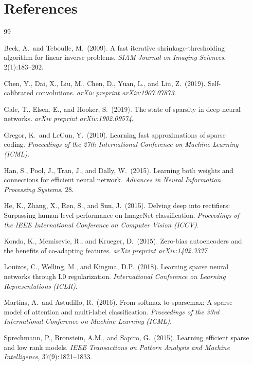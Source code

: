 \documentclass{article}
\begin{document}
\section*{References}
{\small
\begin{thebibliography}{99}

Beck, A.\ and Teboulle, M.\ (2009).
A fast iterative shrinkage-thresholding algorithm for linear inverse problems.
{\it SIAM Journal on Imaging Sciences}, 2(1):183--202.

Chen, Y., Dai, X., Liu, M., Chen, D., Yuan, L., and Liu, Z.\ (2019).
Self-calibrated convolutions.
{\it arXiv preprint arXiv:1907.07873}.

Gale, T., Elsen, E., and Hooker, S.\ (2019).
The state of sparsity in deep neural networks.
{\it arXiv preprint arXiv:1902.09574}.

Gregor, K.\ and LeCun, Y.\ (2010).
Learning fast approximations of sparse coding.
{\it Proceedings of the 27th International Conference on Machine Learning (ICML)}.

Han, S., Pool, J., Tran, J., and Dally, W.\ (2015).
Learning both weights and connections for efficient neural network.
{\it Advances in Neural Information Processing Systems}, 28.

He, K., Zhang, X., Ren, S., and Sun, J.\ (2015).
Delving deep into rectifiers: Surpassing human-level performance on ImageNet classification.
{\it Proceedings of the IEEE International Conference on Computer Vision (ICCV)}.

Konda, K., Memisevic, R., and Krueger, D.\ (2015).
Zero-bias autoencoders and the benefits of co-adapting features.
{\it arXiv preprint arXiv:1402.3337}.

Louizos, C., Welling, M., and Kingma, D.P.\ (2018).
Learning sparse neural networks through L0 regularization.
{\it International Conference on Learning Representations (ICLR)}.

Martins, A.\ and Astudillo, R.\ (2016).
From softmax to sparsemax: A sparse model of attention and multi-label classification.
{\it Proceedings of the 33rd International Conference on Machine Learning (ICML)}.

Sprechmann, P., Bronstein, A.M., and Sapiro, G.\ (2015).
Learning efficient sparse and low rank models.
{\it IEEE Transactions on Pattern Analysis and Machine Intelligence}, 37(9):1821--1833.


\end{thebibliography}}
\end{document}
